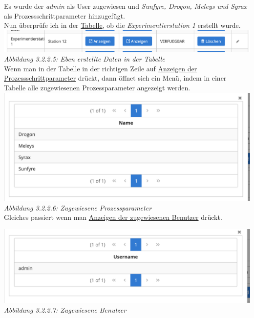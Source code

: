 \documentclass[enabledeprecatedfontcommands,fontsize=12pt,paper=a4,twoside]{scrartcl}
\begin{document}
Es wurde der \textit{admin} als User zugewiesen und \textit{Sunfyre, Drogon, Meleys und Syrax} als Prozessschrittparameter hinzugefügt. \\

Nun überprüfe ich in der \hyperlink{sc3.1.3.5}{Tabelle}, ob die \textit{Experimentierstation 1} erstellt wurde. \\

\hypertarget{sc3.1.3.5}{
\includegraphics[width=1\textwidth]{Screenshots/3135.png}
\textit{Abbildung 3.2.2.5: Eben erstellte Daten in der Tabelle}
} \\

Wenn man in der Tabelle in der richtigen Zeile auf \hyperlink{sc3.1.3.6}{Anzeigen der Prozessschrittparameter} drückt, dann öffnet sich ein Menü, indem in einer Tabelle alle zugewiesenen Prozessparameter angezeigt werden. \\

\hypertarget{sc3.1.3.6}{
\includegraphics[width=1\textwidth]{Screenshots/3136.png}
\textit{Abbildung 3.2.2.6: Zugewiesene Prozessparameter}
} \\

Gleiches passiert wenn man \hyperlink{sc3.1.3.7}{Anzeigen der zugewiesenen Benutzer} drückt. 

\hypertarget{sc3.1.3.7}{
\includegraphics[width=1\textwidth]{Screenshots/3137.png}
\textit{Abbildung 3.2.2.7: Zugewiesene Benutzer}
} \\
\end{document}
